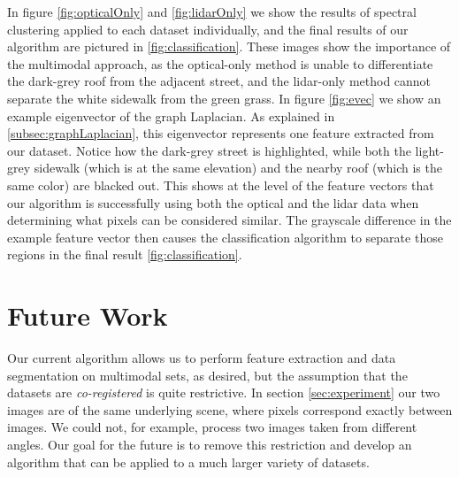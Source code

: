 \documentclass{article}[11pt]
\begin{document}
In figure \ref{fig:opticalOnly} and \ref{fig:lidarOnly} we show the results of
spectral clustering applied to each dataset individually, and the final results
of our algorithm are pictured in \ref{fig:classification}. These images show the
importance of the multimodal approach, as the optical-only method is unable to
differentiate the dark-grey roof from the adjacent street, and the lidar-only
method cannot separate the white sidewalk from the green grass. In figure
\ref{fig:evec} we show an example eigenvector of the graph Laplacian. As
explained in \ref{subsec:graphLaplacian}, this eigenvector represents one
feature extracted from our dataset. Notice how the dark-grey street is
highlighted, while both the light-grey sidewalk (which is at the same elevation)
and the nearby roof (which is the same color) are blacked out. This shows at the
level of the feature vectors that our algorithm is successfully using both the
optical and the lidar data when determining what pixels can be considered
similar. The grayscale difference in the example feature vector then causes the
classification algorithm to separate those regions in the final result
\ref{fig:classification}.

\section{Future Work}
\label{sec:future}

Our current algorithm allows us to perform feature extraction and data
segmentation on multimodal sets, as desired, but the assumption that the
datasets are \emph{co-registered} is quite restrictive. In section
\ref{sec:experiment} our two images are of the same underlying scene, where
pixels correspond exactly between images. We could not, for example, process two
images taken from different angles. Our goal for the future is to remove this
restriction and develop an algorithm that can be applied to a much larger
variety of datasets.
\end{document}
